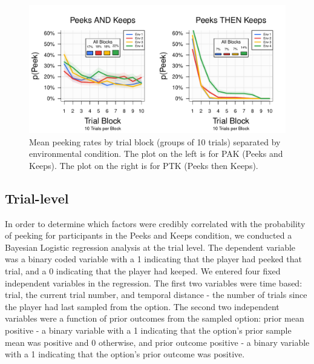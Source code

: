\documentclass[a4paper,doc,natbib,floatsintext]{apa6}\usepackage[]{graphicx}\usepackage[]{color}
\begin{document}
\begin{figure}
\includegraphics[width=\columnwidth]{figures/peekrates.pdf}
\caption{Mean peeking rates by trial block (groups of 10 trials) separated by environmental condition. The plot on the left is for PAK (Peeks and Keeps). The plot on the right is for PTK (Peeks then Keeps).}
\label{fig:peekstime}
\end{figure}




\subsection{Trial-level}



In order to determine which factors were credibly correlated with the probability of peeking for participants in the Peeks and Keeps condition, we conducted a Bayesian Logistic regression analysis at the trial level. The dependent variable was a binary coded variable with a 1 indicating that the player had peeked that trial, and a 0 indicating that the player had keeped. We entered four fixed independent variables in the regression. The first two variables were time based: trial, the current trial number, and temporal distance - the number of trials since the player had last sampled from the option. The second two independent variables were a function of prior outcomes from the sampled option: prior mean positive - a binary variable with a 1 indicating that the option's prior sample mean was positive and 0 otherwise, and prior outcome positive - a binary variable with a 1 indicating that the option's prior outcome was positive.
\end{document}
